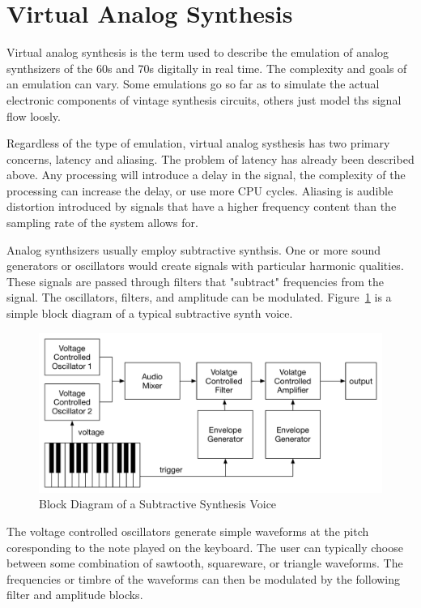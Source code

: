 \section{Virtual Analog Synthesis}

Virtual analog synthesis is the term used to describe the emulation of analog synthsizers of the 60s and 70s digitally in real time. The complexity and goals of an emulation can vary. Some emulations go so far as to simulate the actual electronic components of vintage synthesis circuits, others just model ths signal flow loosly.

Regardless of the type of emulation, virtual analog systhesis has two primary concerns, latency and aliasing. The problem of latency has already been described above. Any processing will introduce a delay in the signal, the complexity of the processing can increase the delay, or use more CPU cycles. Aliasing is audible distortion introduced by signals that have a higher frequency content than the sampling rate of the system allows for.

Analog synthsizers usually employ subtractive synthsis. One or more sound generators or oscillators would create signals with particular harmonic qualities. These signals are passed through filters that "subtract" frequencies from the signal. The oscillators, filters, and amplitude can be modulated. Figure~\ref{fig:synth_voice_block} is a simple block diagram of a typical subtractive synth voice.

\begin{figure}[H]
    \centering
    \includegraphics[width=\textwidth]{assets/synth_voice_block.pdf}
    \caption{Block Diagram of a Subtractive Synthesis Voice}
    \label{fig:synth_voice_block}
\end{figure}

The voltage controlled oscillators generate simple waveforms at the pitch coresponding to the note played on the keyboard. The user can typically choose between some combination of sawtooth, squareware, or triangle waveforms. The frequencies or timbre of the waveforms can then be modulated by the following filter and amplitude blocks.

